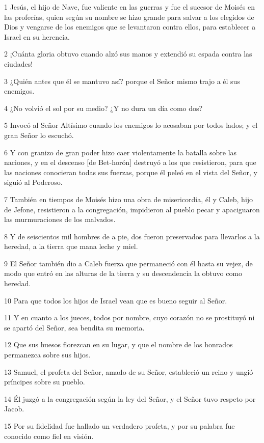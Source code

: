 \par 1 Jesús, el hijo de Nave, fue valiente en las guerras y fue el sucesor de Moisés en las profecías, quien según su nombre se hizo grande para salvar a los elegidos de Dios y vengarse de los enemigos que se levantaron contra ellos, para establecer a Israel en su herencia.
\par 2 ¡Cuánta gloria obtuvo cuando alzó sus manos y extendió su espada contra las ciudades!
\par 3 ¿Quién antes que él se mantuvo así? porque el Señor mismo trajo a él sus enemigos.
\par 4 ¿No volvió el sol por su medio? ¿Y no dura un día como dos?
\par 5 Invocó al Señor Altísimo cuando los enemigos lo acosaban por todos lados; y el gran Señor lo escuchó.
\par 6 Y con granizo de gran poder hizo caer violentamente la batalla sobre las naciones, y en el descenso [de Bet-horón] destruyó a los que resistieron, para que las naciones conocieran todas sus fuerzas, porque él peleó en el vista del Señor, y siguió al Poderoso.
\par 7 También en tiempos de Moisés hizo una obra de misericordia, él y Caleb, hijo de Jefone, resistieron a la congregación, impidieron al pueblo pecar y apaciguaron las murmuraciones de los malvados.
\par 8 Y de seiscientos mil hombres de a pie, dos fueron preservados para llevarlos a la heredad, a la tierra que mana leche y miel.
\par 9 El Señor también dio a Caleb fuerza que permaneció con él hasta su vejez, de modo que entró en las alturas de la tierra y su descendencia la obtuvo como heredad.
\par 10 Para que todos los hijos de Israel vean que es bueno seguir al Señor.
\par 11 Y en cuanto a los jueces, todos por nombre, cuyo corazón no se prostituyó ni se apartó del Señor, sea bendita su memoria.
\par 12 Que sus huesos florezcan en su lugar, y que el nombre de los honrados permanezca sobre sus hijos.
\par 13 Samuel, el profeta del Señor, amado de su Señor, estableció un reino y ungió príncipes sobre su pueblo.
\par 14 Él juzgó a la congregación según la ley del Señor, y el Señor tuvo respeto por Jacob.
\par 15 Por su fidelidad fue hallado un verdadero profeta, y por su palabra fue conocido como fiel en visión.
